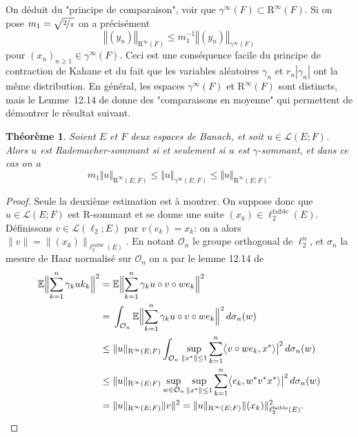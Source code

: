 \documentclass{smfart}
\theoremstyle{plain}
\newtheorem{theorem}{Théorème}[section]
\theoremstyle{definition}
\newcommand{\EE}{\mathbb E}
\newcommand {\FAIBLE} {\text{faible}}
\newcommand{\err}{\mathrm{R}}
\newcommand {\norm}[1] {\| #1 \|}               %
\newcommand {\Bignorm}[1]{\Bigl\| #1 \Bigr\|}
\newcommand {\BOUNDED} {{\mathcal L}}
\begin{document}
\medskip

On déduit du "principe de comparaison", voir \cite[Théorème~3.2]{vdn}
que $\gamma^\infty(F)\subset \err^\infty(F)$. Si on pose
$m_1=\sqrt{\nicefrac{2}{\pi}}$ on a précisément 
\[
 \left \Vert (y_n) \right \Vert _{\err^\infty(F)} 
\le  m_1^{-1}
\left \Vert  (y_n) \right \Vert _{\gamma^\infty(F)}
\]
pour $(x_n)_{n\ge 1} \in \gamma^\infty(F)$. Ceci est une conséquence
facile du principe de contraction de Kahane et du fait que les
variables aléatoires $\gamma_n$ et $r_n |\gamma_n|$ ont la même
distribution.  En général, les espaces $\gamma^\infty(F)$ et
$\err^\infty(F)$ sont distincts, mais le Lemme~12.14 de \cite{DJT}
donne des "comparaisons en moyenne" qui permettent de démontrer le
résultat suivant.

\begin{theorem} \label{thm:gamma-somm-egal-err-somm}
  Soient $E$ et $F$ deux espaces de Banach, et soit $u \in {\mathcal
    L}(E; F)$. Alors $u$ est Rademacher-sommant si et seulement si $u$
  est $\gamma$-sommant, et dans ce cas on a
\[
    m_1\Vert u \Vert_{\err^\infty(E; F)}\le \Vert u \Vert_{\gamma^{\infty}(E; F)}\le \Vert u \Vert_{\err^\infty(E; F)}.
\]
\end{theorem}
\begin{proof} \def\calO{\mathcal O}
  Seule la deuxième estimation est à montrer. On suppose donc que $u
  \in {\mathcal L}(E; F)$ est $\err$-sommant et se donne une suite
  $(x_k) \in \ell_2^\FAIBLE(E)$. Définissons $v \in \BOUNDED(\ell_2;
  E)$ par $v(e_k) = x_k$: on a alors $\norm{v} = \norm{ (x_k)
  }_{\ell_2^\FAIBLE(E)}$. En notant $\calO_n$ le groupe orthogonal de
  $\ell_2^n$, et $\sigma_n$ la mesure de Haar normalisé sur $\calO_n$
  on a par le lemme 12.14 de \cite{DJT} 
  \begin{align*}
\EE \Bignorm{ \sum_{k=1}^n \gamma_k u k_k }^2 
= &\;  \EE \Bignorm{ \sum_{k=1}^n \gamma_k u\circ v \circ w e_k }^2\\
= &\;  \int_{\calO_n} \EE \Bignorm{ \sum_{k=1}^n \gamma_k u\circ v \circ w e_k }^2\,d\sigma_n(w)\\
\le&\; \norm{u}_{\err^\infty(E; F)} \int_{\calO_n} \sup_{\norm{x^*}\le 1} \sum_{k=1}^n \bigl \langle v \circ w e_k, x^* \rangle\bigr|^2\,d\sigma_n(w)\\
\le&\; \norm{u}_{\err^\infty(E; F)} \sup_{w\in \calO_n} \sup_{\norm{x^*}\le 1} \sum_{k=1}^n \bigl \langle e_k, w^* v^* x^* \rangle\bigr|^2\,d\sigma_n(w) \\
 = & \; \norm{u}_{\err^\infty(E; F)} \norm{ v }^2 = \norm{u}_{\err^\infty(E; F)} \norm{  (x_k)   }_{\ell_2^\FAIBLE(E)}^2.\qedhere
  \end{align*}
\end{proof}
\end{document}
